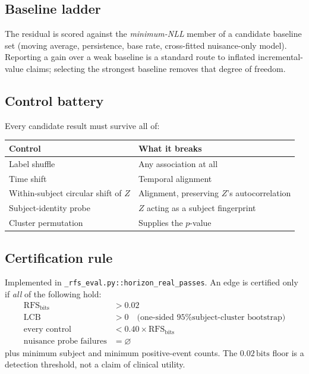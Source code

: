 \documentclass[11pt]{article}
\newcommand{\bits}{\,\mathrm{bits}}
\begin{document}
\subsection{Baseline ladder}
The residual is scored against the \emph{minimum-NLL} member of a candidate
baseline set (moving average, persistence, base rate, cross-fitted nuisance-only
model). Reporting a gain over a weak baseline is a standard route to inflated
incremental-value claims; selecting the strongest baseline removes that degree of
freedom.

\subsection{Control battery}
Every candidate result must survive all of:

\begin{center}
\small
\begin{tabular}{@{}ll@{}}
\toprule
Control & What it breaks \\
\midrule
Label shuffle & Any association at all \\
Time shift & Temporal alignment \\
Within-subject circular shift of $Z$ & Alignment, preserving $Z$'s autocorrelation \\
Subject-identity probe & $Z$ acting as a subject fingerprint \\
Cluster permutation & Supplies the $p$-value \\
\bottomrule
\end{tabular}
\end{center}

\subsection{Certification rule}
\label{sec:cert}
Implemented in \texttt{\_rfs\_eval.py::horizon\_real\_passes}. An edge is
certified only if \emph{all} of the following hold:
\begin{align*}
\mathrm{RFS}_{\text{bits}} &> 0.02 \\
\mathrm{LCB} &> 0 \quad \text{(one-sided 95\% subject-cluster bootstrap)} \\
\text{every control} &< 0.40 \times \mathrm{RFS}_{\text{bits}} \\
\text{nuisance probe failures} &= \varnothing
\end{align*}
plus minimum subject and minimum positive-event counts. The $0.02\bits$ floor is a
detection threshold, not a claim of clinical utility.
\end{document}

